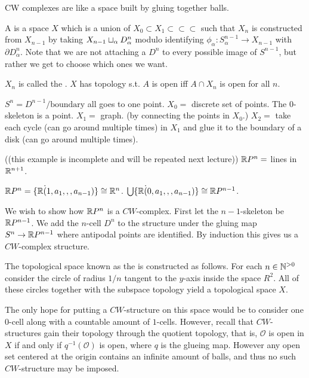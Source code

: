 \documentclass[11pt,leqno,oneside]{amsart}
\newenvironment{dateenv}{
  \vspace{1em}
}{
  \vspace{1em}
}
\newcommand{\mydate}[4]{
  \newdate{#1}{#2}{#3}{#4}
  \begin{dateenv}
    \hfill\displaydate{#1}
  \end{dateenv}
}
\numberwithin{thm}{section}
\renewcommand{\d}{\partial}
\begin{document}
CW complexes are like a space built by gluing together balls.
\begin{defn}
  A  is a space $X$ which is a union of
  $X_0 \subset X_1 \subset \subset \subset$ such that $X_n$ is
  constructed from $X_{n-1}$ by taking
  $X_{n-1} \sqcup_{\alpha} D_{\alpha}^n$ modulo identifying $\phi_\alpha \colon S_\alpha^{n-1} \to X_{n-1}$ with $\d D_\alpha^n$.  Note that we are not attaching a $D^n$ to every possible image of $S^{n-1}$, but rather we get to choose which ones we want.

  $X_n$ is called the .  $X$ has topology s.t. $A$ is open iff $A \cap X_n$ is open for all $n$.
\end{defn}
\begin{example}
  $S^n = D^{n-1}/\text{boundary}$ all goes to one point.  $X_0 =$
  discrete set of points.  The $0$-skeleton is a point.  $X_1 =$
  graph. (by connecting the points in $X_0$.)  $X_2 =$ take each cycle
  (can go around multiple times) in $X_1$ and glue it to the boundary
  of a disk (can go around multiple times).
\end{example}
\begin{example}
  ((this example is incomplete and will be repeated next lecture))
  ${\mathbb R} P^n =$ lines in ${\mathbb R}^{n+1}$.

  ${\mathbb R} P^n = \{ {\mathbb R} \dot (1, a_1,,, a_{n-1})\} \mathrel{\cong} {\mathbb R}^{n}$.
  $\bigcup \{ {\mathbb R} \dot (0, a_1,,, a_{n-1})\} \mathrel{\cong} {\mathbb R} P^{n-1}$.
\end{example}

\mydate{d7}{6}{2}{2017}

We wish to show how \({\mathbb R} P^n\) is a \(CW\)-complex. First let the
\(n-1\)-skeleton be \({\mathbb R} P^{n-1}\). We add the \(n\)-cell \(D^n\) to the
structure under the gluing map \(S^{n} \to {\mathbb R} P^{n-1}\) where
antipodal points are identified. By induction this gives us a
\(CW\)-complex structure.

\begin{example}
  The topological space known as the  is
  constructed as follows.  For each \(n \in {\mathbb N}^{> 0}\) consider the circle of
  radius \(1/n\) tangent to the \(y\)-axis inside the space \(R^2\). All of these circles
  together with the subspace topology yield a topological space \(X\).

  The only hope for putting a \(CW\)-structure on this space would be
  to consider one \(0\)-cell along with a countable amount of
  \(1\)-cells. However, recall that \(CW\)-structures gain their
  topology through the quotient topology, that is, \(\mathcal{O}\) is
  open in \(X\) if and only if \(q^{-1}(\mathcal{O})\) is open, where \(q\) is
  the glueing map. However any open set centered at the origin
  contains an infinite amount of balls, and thus no such
  \(CW\)-structure may be imposed.
\end{example}
\end{document}
